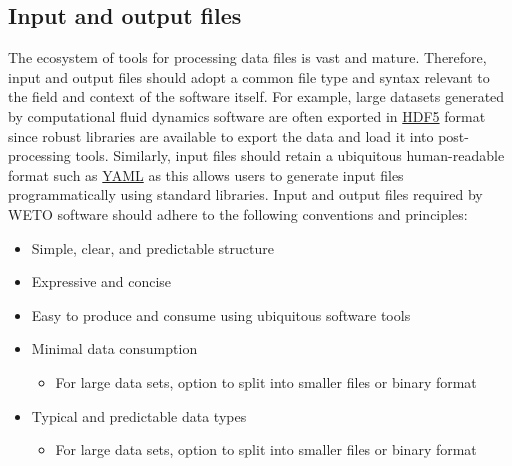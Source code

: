 \documentclass[]{nrel}
\begin{document}
\subsection{Input and output files}
The ecosystem of tools for processing data files is vast and mature.
Therefore, input and output files should adopt a common file type and syntax relevant to the
field and context of the software itself.
For example, large datasets generated by computational fluid dynamics software are often
exported in \href{https://www.hdfgroup.org/solutions/hdf5/}{HDF5} format since robust
libraries are available to export the data and load it into post-processing tools.
Similarly, input files should retain a ubiquitous human-readable format such as
\href{https://yaml.org}{YAML} as this allows users to generate input files programmatically
using standard libraries. Input and output files required by WETO software should
adhere to the following conventions and principles:

\begin{itemize}
\item Simple, clear, and predictable structure
\item Expressive and concise
\item Easy to produce and consume using ubiquitous software tools

\item Minimal data consumption
\begin{itemize}
    \item For large data sets, option to split into smaller files or binary format
\end{itemize}

\item Typical and predictable data types
\begin{itemize}
\item For large data sets, option to split into smaller files or binary format
\end{itemize}

\end{itemize}
\end{document}
